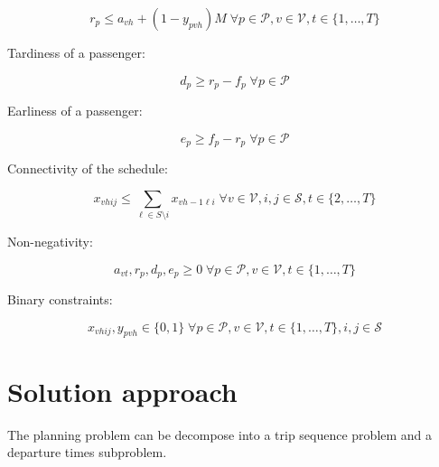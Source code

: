 \documentclass[12pt]{elsarticle}
\begin{document}
\begin{equation}
  \label{eq:arrivaltimepassenger2}
  r_p \le a_{vh} + (1 - y_{pvh})M \; \forall p \in \mathcal{P}, v \in
  \mathcal{V}, t \in \{1,\dots,T\}
\end{equation}

Tardiness of a passenger:

\begin{equation}
  \label{eq:tardiness}
  d_p \ge r_p - f_p  \; \forall p \in \mathcal{P}
\end{equation}

Earliness of a passenger:

\begin{equation}
  \label{eq:tardiness}
  e_p \ge f_p - r_p  \; \forall p \in \mathcal{P}
\end{equation}

Connectivity of the schedule:

\begin{equation}
x_{vhij} \le \sum_{\ell \in S\setminus i} x_{vh-1\ell i} \; \forall v \in  \mathcal{V}, i,j \in \mathcal{S}, t \in \{2,\dots,T\}
\end{equation}

Non-negativity:

\begin{equation}
  \label{eq:nonnegativity}
  a_{vt}, r_p, d_p, e_p \ge 0 \; \forall p \in \mathcal{P}, v \in
  \mathcal{V}, t \in \{1,\dots,T\}
\end{equation}

Binary constraints:

\begin{equation}
  \label{eq:binary}
  x_{vhij}, y_{pvh} \in \{0,1\} \; \forall p \in \mathcal{P}, v \in
  \mathcal{V}, t \in \{1,\dots,T\}, i,j \in \mathcal{S}
\end{equation}

\section{Solution approach}

The planning problem can be decompose into a trip sequence problem and a
departure times subproblem. \cite{Sanchez2017}
\end{document}
